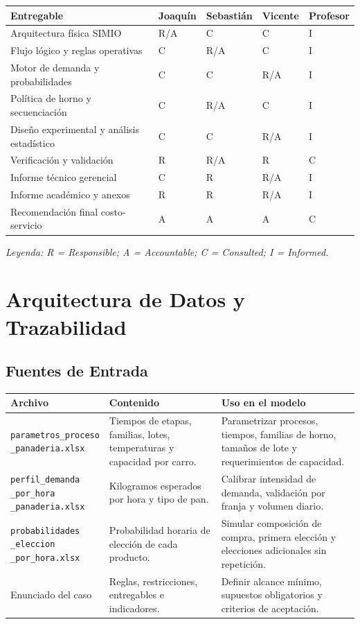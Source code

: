 \documentclass[11pt,letterpaper]{article}
\begin{document}
\begin{tabularx}{\textwidth}{L{4.8cm}L{2.4cm}L{2.4cm}L{2.4cm}Y}
  \toprule
  \textbf{Entregable} & \textbf{Joaquín} & \textbf{Sebastián} & \textbf{Vicente} & \textbf{Profesor} \\
  \midrule
  Arquitectura física SIMIO & R/A & C & C & I \\
  Flujo lógico y reglas operativas & C & R/A & C & I \\
  Motor de demanda y probabilidades & C & C & R/A & I \\
  Política de horno y secuenciación & C & R/A & C & I \\
  Diseño experimental y análisis estadístico & C & C & R/A & I \\
  Verificación y validación & R & R/A & R & C \\
  Informe técnico gerencial & C & R & R/A & I \\
  Informe académico y anexos & R & R & R/A & I \\
  Recomendación final costo-servicio & A & A & A & C \\
  \bottomrule
\end{tabularx}

\textit{Leyenda: R = Responsible; A = Accountable; C = Consulted; I = Informed.}

\section{Arquitectura de Datos y Trazabilidad}

\subsection{Fuentes de Entrada}

\begin{tabularx}{\textwidth}{L{4.0cm}L{4.6cm}Y}
  \toprule
  \textbf{Archivo} & \textbf{Contenido} & \textbf{Uso en el modelo} \\
  \midrule
  \parbox[t]{4.0cm}{\texttt{parametros\_proceso}\\\texttt{\_panaderia.xlsx}} & Tiempos de etapas, familias, lotes, temperaturas y capacidad por carro. & Parametrizar procesos, tiempos, familias de horno, tamaños de lote y requerimientos de capacidad. \\
  \parbox[t]{4.0cm}{\texttt{perfil\_demanda}\\\texttt{\_por\_hora}\\\texttt{\_panaderia.xlsx}} & Kilogramos esperados por hora y tipo de pan. & Calibrar intensidad de demanda, validación por franja y volumen diario. \\
  \parbox[t]{4.0cm}{\texttt{probabilidades}\\\texttt{\_eleccion}\\\texttt{\_por\_hora.xlsx}} & Probabilidad horaria de elección de cada producto. & Simular composición de compra, primera elección y elecciones adicionales sin repetición. \\
  Enunciado del caso & Reglas, restricciones, entregables e indicadores. & Definir alcance mínimo, supuestos obligatorios y criterios de aceptación. \\
  \bottomrule
\end{tabularx}
\end{document}
